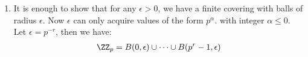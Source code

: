 \begin{enumerate}[label=]
    \item 
        It is enough to show that for any $\epsilon > 0$, we have a finite covering with balls of radius $\epsilon$. Now $\epsilon$ can only acquire values of the form $p^\alpha$. with integer $\alpha \le 0$. Let $\epsilon = p^{-r}$, then we have:
        \begin{gather*}
            \ZZ_p = B(0, \epsilon) \cup \dots \cup B(p^r - 1, \epsilon)
        \end{gather*}
\end{enumerate}